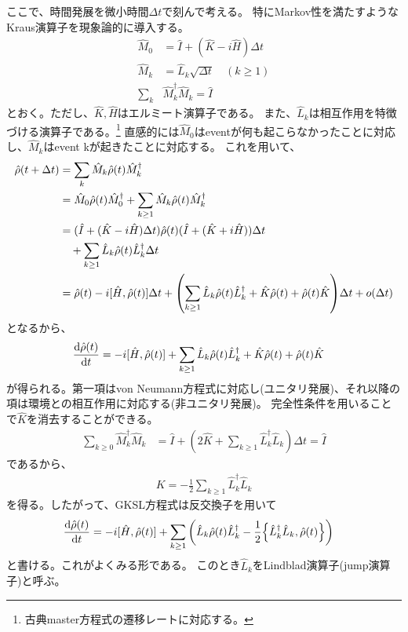 \documentclass[a4paper,11pt]{jsarticle}
\numberwithin{equation}{section}
\begin{document}
ここで、時間発展を微小時間$\Delta t$で刻んで考える。
特にMarkov性を満たすようなKraus演算子を現象論的に導入する。
\begin{align}
    \hat{M}_{0} &= \hat{I} +(\hat{K}-i\hat{H})\Delta t \\
    \hat{M}_{k} &= \hat{L}_{k} \sqrt{\Delta t} \quad (k\geq 1)\\
    \sum_{k}& \hat{M}_{k}^\dagger \hat{M}_{k} = \hat{I} 
\end{align}
とおく。ただし、$\hat{K},\hat{H}$はエルミート演算子である。
また、$\hat{L}_{k}$は相互作用を特徴づける演算子である。\footnote{古典master方程式の遷移レートに対応する。}
直感的には$\hat{M}_{0}$はeventが何も起こらなかったことに対応し、$\hat{M}_{k}$はevent kが起きたことに対応する。
これを用いて、
\begin{align}
    \hat{\rho}(t+\Delta t) &= \sum_{k} \hat{M}_{k} \hat{\rho}(t) \hat{M}_{k}^\dagger \\
    &= \hat{M}_{0} \hat{\rho}(t) \hat{M}_{0}^\dagger + \sum_{k\geq 1} \hat{M}_{k} \hat{\rho}(t) \hat{M}_{k}^\dagger\\
    &= (\hat{I} +(\hat{K}-i\hat{H})\Delta t) \hat{\rho}(t) (\hat{I} +(\hat{K}+i\hat{H}))\Delta t \\
    &\quad + \sum_{k\geq 1} \hat{L}_{k} \hat{\rho}(t) \hat{L}_{k}^\dagger \Delta t \\
    &= \hat{\rho}(t) -i[\hat{H}, \hat{\rho}(t)]\Delta t + \qty(\sum_{k\geq 1} \hat{L}_{k} \hat{\rho}(t) \hat{L}_{k}^\dagger + \hat{K}\hat{\rho}(t) + \hat{\rho}(t)\hat{K})\Delta t + o(\Delta t)
\end{align}
となるから、
\begin{align}
    \dv{\hat{\rho}(t)}{t} &= -i[\hat{H}, \hat{\rho}(t)] + \sum_{k\geq 1} \hat{L}_{k} \hat{\rho}(t) \hat{L}_{k}^\dagger + \hat{K}\hat{\rho}(t) + \hat{\rho}(t)\hat{K}
\end{align}
が得られる。第一項はvon Neumann方程式に対応し(ユニタリ発展)、それ以降の項は環境との相互作用に対応する(非ユニタリ発展)。
完全性条件を用いることで$\hat{K}$を消去することができる。
\begin{align}
    \sum_{k\geq 0} \hat{M}_{k}^\dagger \hat{M}_{k} &= \hat{I} +(2\hat{K} + \sum_{k\geq 1} \hat{L}_{k}^\dagger \hat{L}_{k})\Delta t = \hat{I}
\end{align}
であるから、
\begin{align}
    K = -\frac{1}{2}\sum_{k\geq 1} \hat{L}_{k}^{\dagger} \hat{L}_{k}
\end{align}
を得る。したがって、GKSL方程式は反交換子を用いて
\begin{align}
    \dv{\hat{\rho}(t)}{t} &= -i[\hat{H}, \hat{\rho}(t)] + \sum_{k\geq 1}\qty(\hat{L}_{k} \hat{\rho}(t) \hat{L}_{k}^\dagger - \frac{1}{2}\qty{\hat{L}_{k}^\dagger \hat{L}_{k}, \hat{\rho}(t)}) \label{eq:QME}
\end{align}
と書ける。これがよくみる形である。
このとき$\hat{L}_{k}$をLindblad演算子(jump演算子)と呼ぶ。
\end{document}
